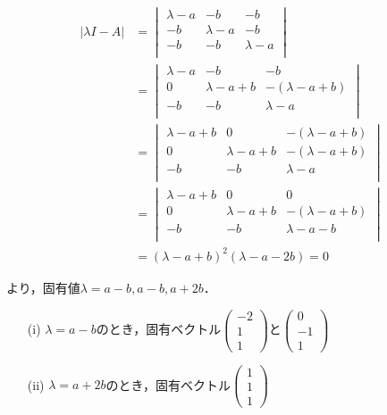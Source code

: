 \documentclass[a4j]{jarticle}
\begin{document}
\begin{align*}
 \left|\lambda I - A \right| &=
 \begin{vmatrix}
  \lambda -a & -b & -b \\
  -b & \lambda -a & -b \\
  -b & -b & \lambda -a \\
 \end{vmatrix}\\
 &=
 \begin{vmatrix}
  \lambda -a & -b & -b \\
  0 & \lambda -a+b & -(\lambda-a+b) \\
  -b & -b & \lambda -a \\
 \end{vmatrix}\\
 &=
 \begin{vmatrix}
  \lambda -a+b & 0 & -(\lambda-a+b) \\
  0 & \lambda -a+b & -(\lambda-a+b) \\
  -b & -b & \lambda -a \\
 \end{vmatrix}\\
 &=
 \begin{vmatrix}
  \lambda -a+b & 0 & 0 \\
  0 & \lambda -a+b & -(\lambda-a+b) \\
  -b & -b & \lambda -a-b \\
 \end{vmatrix}\\
 &= (\lambda - a + b)^2(\lambda - a -2b) = 0
\end{align*}

より，固有値$\lambda = a-b,a-b,a+2b$．

\begin{itemize}
 \item[(i)] $\lambda=a-b$のとき，固有ベクトル$\left(\begin{array}{c}-2\\1\\1\end{array}\right)$と$\left(\begin{array}{c}0\\-1\\1\end{array}\right)$
 \item[(ii)] $\lambda=a+2b$のとき，固有ベクトル$\left(\begin{array}{c}1\\1\\1\end{array}\right)$
\end{itemize}
\end{document}

